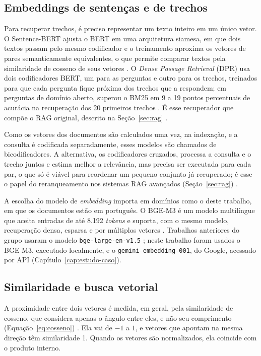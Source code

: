 \subsection{Embeddings de sentenças e de trechos}

Para recuperar trechos, é preciso representar um texto inteiro em um único vetor. O Sentence-BERT ajusta o BERT em uma arquitetura siamesa, em que dois textos passam pelo mesmo codificador e o treinamento aproxima os vetores de pares semanticamente equivalentes, o que permite comparar textos pela similaridade de cosseno de seus vetores \cite{Reimers2019}. O \textit{Dense Passage Retrieval} (DPR) usa dois codificadores BERT, um para as perguntas e outro para os trechos, treinados para que cada pergunta fique próxima dos trechos que a respondem; em perguntas de domínio aberto, superou o BM25 em 9 a 19 pontos percentuais de acurácia na recuperação dos 20 primeiros trechos \cite{Karpukhin2020}. É esse recuperador que compõe o RAG original, descrito na Seção~\ref{sec:rag} \cite{Lewis2020}.

Como os vetores dos documentos são calculados uma vez, na indexação, e a consulta é codificada separadamente, esses modelos são chamados de bicodificadores. A alternativa, os codificadores cruzados, processa a consulta e o trecho juntos e estima melhor a relevância, mas precisa ser executada para cada par, o que só é viável para reordenar um pequeno conjunto já recuperado; é esse o papel do reranqueamento nos sistemas RAG avançados (Seção~\ref{sec:rag}) \cite{Gao2023}.

A escolha do modelo de \textit{embedding} importa em domínios como o deste trabalho, em que os documentos estão em português. O BGE-M3 é um modelo multilíngue que aceita entradas de até 8.192 \textit{tokens} e suporta, com o mesmo modelo, recuperação densa, esparsa e por múltiplos vetores \cite{Chen2024}. Trabalhos anteriores do grupo usaram o modelo \texttt{bge-large-en-v1.5} \cite{Montero2025}; neste trabalho foram usados o BGE-M3, executado localmente, e o \texttt{gemini-embedding-001}, do Google, acessado por API (Capítulo~\ref{cap:estudo-caso}).

\subsection{Similaridade e busca vetorial}

A proximidade entre dois vetores é medida, em geral, pela similaridade de cosseno, que considera apenas o ângulo entre eles, e não seu comprimento (Equação~\ref{eq:cosseno}) \cite{Manning2008}. Ela vai de $-1$ a $1$, e vetores que apontam na mesma direção têm similaridade 1. Quando os vetores são normalizados, ela coincide com o produto interno.

